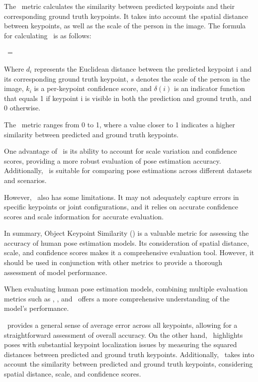 The \OKS\ metric calculates the similarity between predicted keypoints and their corresponding ground truth keypoints. It takes into account the spatial distance between keypoints, as well as the scale of the person in the image. The formula for calculating \OKS\ is as follows:

\startplaceformula[reference=oks]
    \startformula \OKS\ = 
    \stopformula
\stopplaceformula

Where $ d_i $ represents the Euclidean distance between the predicted keypoint i and its corresponding ground truth keypoint, $ s $ denotes the scale of the person in the image, $ k_i $ is a per-keypoint confidence score, and $ \delta(i) $ is an indicator function that equals 1 if keypoint i is visible in both the prediction and ground truth, and 0 otherwise.

The \OKS\ metric ranges from 0 to 1, where a value closer to 1 indicates a higher similarity between predicted and ground truth keypoints.

One advantage of \OKS\ is its ability to account for scale variation and confidence scores, providing a more robust evaluation of pose estimation accuracy. Additionally, \OKS\ is suitable for comparing pose estimations across different datasets and scenarios.

However, \OKS\ also has some limitations. It may not adequately capture errors in specific keypoints or joint configurations, and it relies on accurate confidence scores and scale information for accurate evaluation.

In summary, Object Keypoint Similarity (\OKS) is a valuable metric for assessing the accuracy of human pose estimation models. Its consideration of spatial distance, scale, and confidence scores makes it a comprehensive evaluation tool. However, it should be used in conjunction with other metrics to provide a thorough assessment of model performance.


When evaluating human pose estimation models, combining multiple evaluation metrics such as \APE, \MSE, and \OKS\ offers a more comprehensive understanding of the model's performance.

\APE\ provides a general sense of average error across all keypoints, allowing for a straightforward assessment of overall accuracy. On the other hand, \MSE\ highlights poses with substantial keypoint localization issues by measuring the squared distances between predicted and ground truth keypoints. Additionally, \OKS\ takes into account the similarity between predicted and ground truth keypoints, considering spatial distance, scale, and confidence scores.

